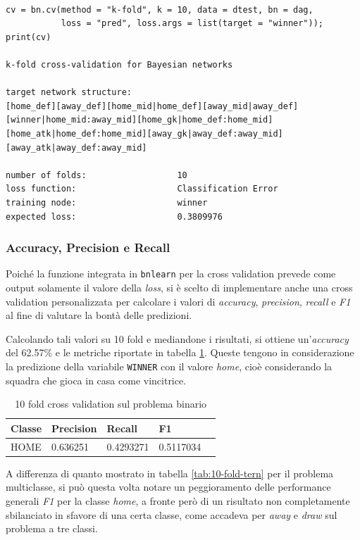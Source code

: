 \documentclass[hidelinks, 12pt]{article}
\begin{document}
\begin{verbatim}

cv = bn.cv(method = "k-fold", k = 10, data = dtest, bn = dag,
           loss = "pred", loss.args = list(target = "winner"));
print(cv)

k-fold cross-validation for Bayesian networks

target network structure:
[home_def][away_def][home_mid|home_def][away_mid|away_def]
[winner|home_mid:away_mid][home_gk|home_def:home_mid]
[home_atk|home_def:home_mid][away_gk|away_def:away_mid]
[away_atk|away_def:away_mid]

number of folds:                  10 
loss function:                    Classification Error 
training node:                    winner 
expected loss:                    0.3809976 
\end{verbatim}


\subsubsection{Accuracy, Precision e Recall}

Poiché la funzione integrata in \texttt{bnlearn} per la cross validation prevede come output solamente il valore della \textit{loss}, si è scelto di implementare anche una cross validation personalizzata per calcolare i valori di \textit{accuracy}, \textit{precision}, \textit{recall} e \textit{F1} al fine di valutare la bontà delle predizioni.

Calcolando tali valori su 10 fold e mediandone i risultati, si ottiene un'\textit{accuracy} del 62.57\% e le metriche riportate in tabella \ref{tab:10-fold-bin}. Queste tengono in considerazione la predizione della variabile \texttt{WINNER} con il valore \textit{home}, cioè considerando la squadra che gioca in casa come vincitrice.

\begin{table}[H]
	\centering
	\caption{10 fold cross validation sul problema binario}
	\begin{tabular}{l|llll}
		\hline
		Classe & Precision & Recall & F1 \\
		\hline
		HOME & 0.636251 & 0.4293271 & 0.5117034  \\
		\hline
	\end{tabular}
	\label{tab:10-fold-bin}
\end{table}

A differenza di quanto mostrato in tabella \ref{tab:10-fold-tern} per il problema multiclasse, si può questa volta notare un peggioramento delle performance generali \textit{F1} per la classe \textit{home}, a fronte però di un risultato non completamente sbilanciato in sfavore di una certa classe, come accadeva per \textit{away} e \textit{draw} sul problema a tre classi.
\end{document}

